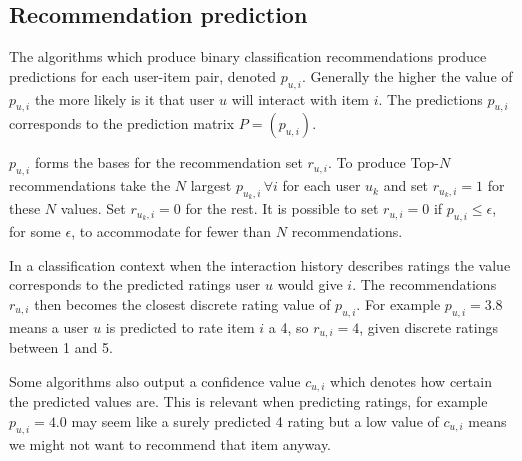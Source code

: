 
\subsection{Recommendation prediction}\label{sec:background:theory:pred}

The algorithms which produce binary classification recommendations produce predictions for each user-item pair, denoted $p_{u, i}$. Generally the higher the value of $p_{u, i}$ the more likely is it that user $u$ will interact with item $i$. The predictions $p_{u, i}$ corresponds to the prediction matrix $P = (p_{u, i})$.

$p_{u, i}$ forms the bases for the recommendation set $r_{u, i}$. To produce Top-$N$ recommendations take the $N$ largest $p_{u_k, i} \, \forall i$ for each user $u_k$ and set $r_{u_k, i} = 1$ for these $N$ values. Set $r_{u_k, i} = 0$ for the rest. It is possible to set $r_{u, i} = 0$ if $p_{u, i} \leq \epsilon$, for some $\epsilon$, to accommodate for fewer than $N$ recommendations.

In a classification context when the interaction history describes ratings the value corresponds to the predicted ratings user $u$ would give $i$. The recommendations $r_{u, i}$ then becomes the closest discrete rating value of $p_{u, i}$. For example $p_{u, i} = 3.8$ means a user $u$ is predicted to rate item $i$ a 4, so $r_{u, i} = 4$, given discrete ratings between 1 and 5.

Some algorithms also output a confidence value $c_{u, i}$ which denotes how certain the predicted values are. This is relevant when predicting ratings, for example $p_{u, i} = 4.0$ may seem like a surely predicted 4 rating but a low value of $c_{u, i}$ means we might not want to recommend that item anyway.

